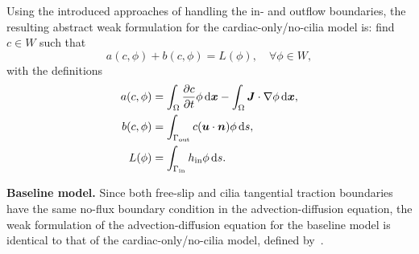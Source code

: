 \documentclass{WileyMSP-template}
\begin{document}
Using the introduced approaches of handling the in- and outflow boundaries,
the resulting abstract weak formulation for the cardiac-only/no-cilia model is:
find $c\in W$ such that
\begin{equation}
    a(c, \phi) + b(c, \phi) = L(\phi), \quad\forall\phi\in W, \label{eq:adv_diff_weak_formB}
\end{equation}
with the definitions
\begin{align}
    a(c, \phi) &= \int_{\Omega}\frac{\partial c}{\partial t}\phi \, \mathrm d\bm{x} - \int_{\Omega}\bm{J}\cdot\nabla\phi \, \mathrm d\bm{x},
    \label{eq:adv_diff_bilinear_form}\\
    b(c, \phi) &= \int_{\Gamma_{\mathrm{out}}}c(\bm{u}\cdot\bm{n})\phi \, \mathrm ds, \label{eq:adv_diff_skew_form} \\
    L(\phi) &= \int_{\Gamma_{\mathrm{in}}}h_{\mathrm{in}}\phi \, \mathrm ds.\label{eq:adv_diff_linear_form}
\end{align}

\textbf{Baseline model.} Since both free-slip and cilia tangential
traction boundaries have the same no-flux boundary condition
in the advection-diffusion equation, the weak formulation of
the advection-diffusion equation for the baseline model is
identical to that of the cardiac-only/no-cilia model,
defined by~.
\end{document}
